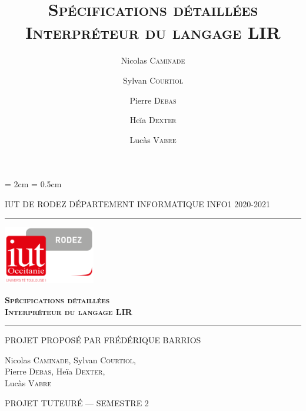 \documentclass[12pt,a4paper,titlepage,openany, oneside]{report}
\title{\textsc{\textbf{Spécifications détaillées\\Interpréteur du langage LIR}}}
\date{}
\author{Nicolas \textsc{Caminade} \and Sylvan \textsc{Courtiol} \and
    Pierre \textsc{Debas} \and Heïa \textsc{Dexter} \and Lucàs
    \textsc{Vabre} }
\begin{document}
    \lhead{\leftmark}

    \cfoot{\thepage}
    \headheight = 2cm
    \headsep = 0.5cm

    \begin{titlepage}
        \selectfont

        \begin{center}\normalsize
            \MakeUppercase{IUT de Rodez \hfill Département informatique
                \hfill INFO1 2020-2021}
        \end{center}
        \vspace*{0.1cm}
        \hrule
        \vspace*{0.2cm}
        \begin{flushright}
            \includegraphics[width=4cm]{./img/logoiut}
        \end{flushright}
        \vspace*{2cm}
        \begin{flushright}\Huge
            \textsc{\textbf{Spécifications détaillées
                    \\Interpréteur du langage LIR}}
        \end{flushright}
        \hrule
        \begin{flushleft}
            \MakeUppercase{Projet proposé par Frédérique Barrios}
        \end{flushleft}
        \vspace*{2cm}
        \begin{center}\Large
            Nicolas \textsc{Caminade}, Sylvan \textsc{Courtiol},\\
            Pierre \textsc{Debas}, Heïa \textsc{Dexter}, \\
            Lucàs \textsc{Vabre}
        \end{center}
        \vfill
        \begin{center}\normalsize
            \MakeUppercase{Projet tuteuré --- Semestre 2}
        \end{center}
    \end{titlepage}
\end{document}
